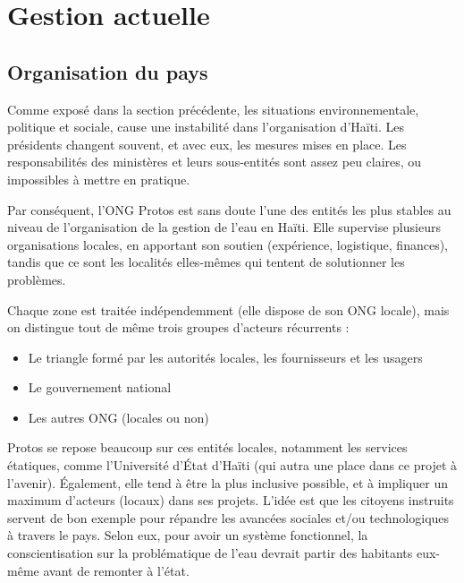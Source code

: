 \documentclass{eplmastersthesis_FR}
\begin{document}
		\section{Gestion actuelle}

			\subsection*{Organisation du pays}

    			Comme exposé dans la section précédente, les situations environnementale, politique et sociale, cause une instabilité dans l'organisation d'Haïti. Les présidents changent souvent, et avec eux, les mesures mises en place. Les responsabilités des ministères et leurs sous-entités sont assez peu claires, ou impossibles à mettre en pratique.

    			Par conséquent, l'ONG Protos est sans doute l'une des entités les plus stables au niveau de l'organisation de la gestion de l'eau en Haïti. Elle supervise plusieurs organisations locales, en apportant son soutien (expérience, logistique, finances), tandis que ce sont les localités elles-mêmes qui tentent de solutionner les problèmes.

    			Chaque zone est traitée indépendemment (elle dispose de son ONG locale), mais on distingue tout de même trois groupes d'acteurs récurrents :
    			\begin{itemize}
    				\item Le triangle formé par les autorités locales, les fournisseurs et les usagers
    				\item Le gouvernement national
    				\item Les autres ONG (locales ou non)
    			\end{itemize}

    			Protos se repose beaucoup sur ces entités locales, notamment les services étatiques, comme l'Université d'\'Etat d'Haïti (qui autra une place dans ce projet à l'avenir). \'Egalement, elle tend à être la plus inclusive possible, et à impliquer un maximum d'acteurs (locaux) dans ses projets. L'idée est que les citoyens instruits servent de bon exemple pour répandre les avancées sociales et/ou technologiques à travers le pays. Selon eux, pour avoir un système fonctionnel, la conscientisation sur la problématique de l'eau devrait partir des habitants eux-même avant de remonter à l'état.

\end{document}
